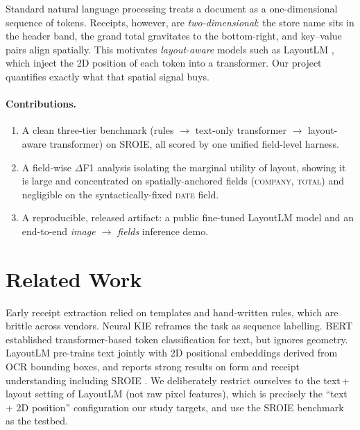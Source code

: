 \documentclass[11pt]{article}
\begin{document}
Standard natural language processing treats a document as a one-dimensional
sequence of tokens. Receipts, however, are \emph{two-dimensional}: the store name
sits in the header band, the grand total gravitates to the bottom-right, and
key--value pairs align spatially. This motivates \emph{layout-aware} models such
as LayoutLM \citep{xu2020layoutlm}, which inject the 2D position of each token
into a transformer. Our project quantifies exactly what that spatial signal buys.

\paragraph{Contributions.}
\begin{enumerate}
\item A clean three-tier benchmark (rules $\rightarrow$ text-only transformer
$\rightarrow$ layout-aware transformer) on SROIE, all scored by one unified
field-level harness.
\item A field-wise $\Delta$F1 analysis isolating the marginal utility of layout,
showing it is large and concentrated on spatially-anchored fields
(\textsc{company}, \textsc{total}) and negligible on the syntactically-fixed
\textsc{date} field.
\item A reproducible, released artifact: a public fine-tuned LayoutLM model and
an end-to-end \emph{image $\rightarrow$ fields} inference demo.
\end{enumerate}

\section{Related Work}
Early receipt extraction relied on templates and hand-written rules, which are
brittle across vendors. Neural KIE reframes the task as sequence labelling.
BERT \citep{devlin2019bert} established transformer-based token classification
for text, but ignores geometry. LayoutLM \citep{xu2020layoutlm} pre-trains text
jointly with 2D positional embeddings derived from OCR bounding boxes, and reports
strong results on form and receipt understanding including SROIE
\citep{huang2019sroie}. We deliberately restrict ourselves to the text\,+\,layout
setting of LayoutLM (not raw pixel features), which is precisely the ``text + 2D
position'' configuration our study targets, and use the SROIE benchmark as the
testbed.
\end{document}
